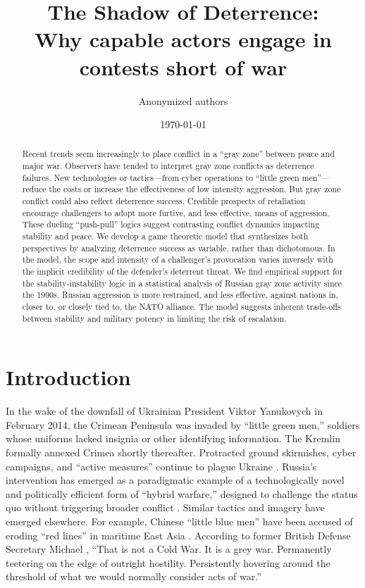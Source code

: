 \documentclass[11pt,letterpaper,pdftex,dvipsnames,table]{article}
\title{The Shadow of Deterrence: \\ Why capable actors engage in contests short of war}
\author{Anonymized authors %
}
\date{\today}
\begin{document}
\maketitle


\begin{abstract} \noindent
\begin{singlespace}
Recent trends seem increasingly to place conflict in a ``gray zone'' between peace and major war. Observers have tended to interpret gray zone conflicts as deterrence failures. New technologies or tactics---from cyber operations to ``little green men''---reduce the costs or increase the effectiveness of low intensity aggression. But gray zone conflict could also reflect deterrence success. Credible prospects of retaliation  encourage challengers to adopt more furtive, and less effective, means of aggression. These dueling ``push-pull'' logics suggest contrasting conflict dynamics impacting stability and peace. We develop a game theoretic model that synthesizes both perspectives by analyzing deterrence success as variable, rather than dichotomous. In the model, the scope and intensity of a challenger's provocation varies inversely with the implicit credibility of the defender's deterrent threat. We find empirical support for the stability-instability logic in a statistical analysis of Russian gray zone activity since the 1990s. Russian aggression is more restrained, and less effective, against nations in, closer to, or closely tied to, the NATO alliance. The model suggests inherent trade-offs between stability and military potency in limiting the risk of escalation.
\end{singlespace}
\end{abstract}

\newpage

\section{Introduction}

In the wake of the downfall of Ukrainian President Viktor Yanukovych in February 2014, the Crimean Peninsula was invaded by “little green men,” soldiers whose uniforms lacked insignia or other identifying information. The Kremlin formally annexed Crimea shortly thereafter. Protracted ground skirmishes, cyber campaigns, and ``active measures'' continue to plague Ukraine \citep{angevine_learninglessonsukraine_2019}. Russia's intervention has emerged as a paradigmatic example of a technologically novel and politically efficient form of ``hybrid warfare,'' designed to challenge the status quo without triggering broader conflict \citep{marten_putinchoicesexplaining_2015, lanoszka_russianhybridwarfare_2016, chivvis_hybridwarrussian_2017}. Similar tactics and imagery have emerged elsewhere. For example, Chinese ``little blue men'' have been accused of eroding ``red lines'' in maritime East Asia \citep{green_counteringcoercionmaritime_2017}. According to former British Defense Secretary Michael \citet{fallon_speechdeliveredsecretary_2017}, ``That is not a Cold War. It is a grey war. Permanently teetering on the edge of outright hostility. Persistently hovering around the threshold of what we would normally consider acts of war.''
\end{document}
